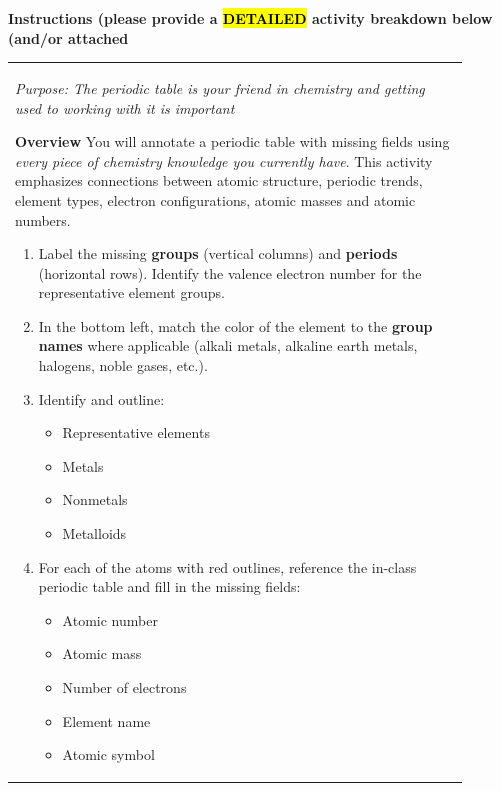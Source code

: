 \documentclass{article}
\begin{document}
\begin{flushleft}
\vspace{0.5cm}
\noindent
{\large \textbf{Instructions (please provide a \hl{DETAILED} activity breakdown below (and/or attached}} \\
\newpage

\begin{tabular}{|p{0.9\linewidth}|}
\hline

\vspace{0.2cm}
\textit{Purpose: The periodic table is your friend in chemistry and getting used to working with it is important}

\vspace{1em}

\textbf{Overview}
You will annotate a periodic table with missing fields using \emph{every piece of chemistry knowledge you currently have}. This activity emphasizes connections between atomic structure, periodic trends, element types, electron configurations, atomic masses and atomic numbers.

\begin{enumerate}
\item Label the missing \textbf{groups} (vertical columns) and \textbf{periods} (horizontal rows). Identify the valence electron number for the representative element groups.

\item In the bottom left, match the color of the element to the \textbf{group names} where applicable (alkali metals, alkaline earth metals, halogens, noble gases, etc.).

\item Identify and outline:
\begin{itemize}
\item Representative elements
\item Metals
\item Nonmetals
\item Metalloids
\end{itemize}

\item For each of the atoms with red outlines, reference the in-class periodic table and fill in the missing fields:
\begin{itemize}
\item Atomic number
\item Atomic mass
\item Number of electrons
\item Element name
\item Atomic symbol
\end{itemize}


\end{enumerate}
\end{tabular}
\end{flushleft}
\end{document}
